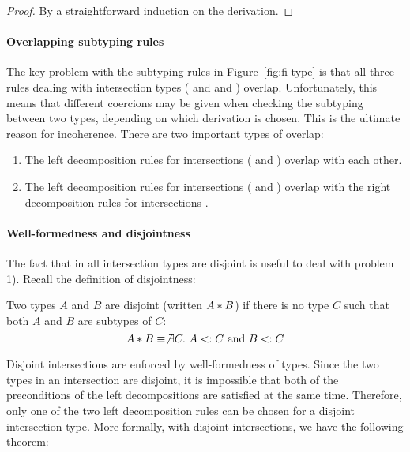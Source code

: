 \begin{proof}
  By a straightforward induction on the derivation.
\end{proof}

\paragraph{Overlapping subtyping rules} The key problem with the
subtyping rules in Figure~\ref{fig:fi-type} is that all three rules dealing
with intersection types ( and
 and ) overlap.
Unfortunately, this means that different coercions may be given when checking
the subtyping between two types, depending on which derivation is chosen. This
is the ultimate reason for incoherence. There are two important types of
overlap:

\begin{enumerate}

\item The left decomposition rules for intersections (
and ) overlap with each other.

\item The left decomposition rules for intersections (
and ) overlap with the right decomposition rules for
intersections .

\end{enumerate}

\paragraph{Well-formedness and disjointness} 
The fact that in \name all intersection types are disjoint is useful to deal
with problem 1). Recall the definition of disjointness:

\begin{definition}\label{def:simple_dis}
  Two types $A$ and $B$ are disjoint
  (written $A * B$) if there is no type $C$ such that both $A$ and $B$ are
  subtypes of $C$:
  \[A * B \equiv \not\exists C.~A <: C~\text{and}~B <: C\]
\end{definition}

Disjoint intersections are enforced by well-formedness of types.
Since the two types in an intersection are disjoint, it is impossible
that both of the preconditions of the left decompositions are
satisfied at the same time. Therefore, only one of the two left
decomposition rules can be chosen for a disjoint intersection
type. More formally, with disjoint intersections, we have the
following theorem:

